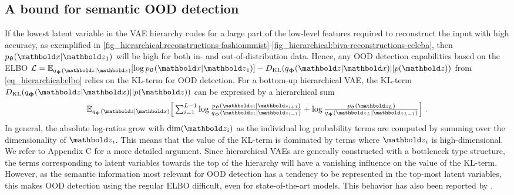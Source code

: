 {\subsection{A bound for semantic OOD detection}
If the lowest latent variable in the VAE hierarchy codes for a large part of the low-level features required to reconstruct the input with high accuracy, as exemplified in \cref{fig_hierarchical:reconstructions-fashionmnist}-\ref{fig_hierarchical:biva-reconstructions-celeba}, then $p_\thetab(\xb|\zb_1)$ will be high for both in- and out-of-distribution data.
Hence, any OOD detection capabilities based on the ELBO $\mathcal{L} = \mathbb{E}_{q_\phib(\zb|\xb)}[\log p_\thetab(\xb|\zb_1)] - D_{\mathrm{KL}}( q_\phib(\zb|\xb) || p(\zb))$ from \cref{eq_hierarchical:elbo} relies on the KL-term for OOD detection. For a bottom-up hierarchical VAE, the KL-term $D_{\mathrm{KL}}( q_\phib(\zb|\xb) || p(\zb))$ can be expressed by a hierarchical sum%
\begin{equation}
    \mathbb{E}_{q_\phib(\zb|\xb)} \Big[ \textstyle\sum_{i=1}^{L-1} \log \frac{p_\thetab(\zb_i|\zb_{i+1})}{q_\phib(\zb_i|\zb_{i-1})} + \log \frac{p_\thetab(\zb_L)}{q_\phib(\zb_L|\zb_{L-1})} \Big] \ .
\end{equation}
In general, the absolute log-ratios grow with $\mathrm{dim}(\zb_i)$ as the individual log probability terms are computed by summing over the dimensionality of $\zb_i$.
This means that the value of the KL-term is dominated by terms where $\zb_i$ is high-dimensional. We refer to Appendix C for a more detailed argument.
Since hierarchical VAEs are generally constructed with a bottleneck type structure, the terms corresponding to latent variables towards the top of the hierarchy will have a vanishing influence on the value of the KL-term.
However, as the semantic information most relevant for OOD detection has a tendency to be represented in the top-most latent variables, this makes OOD detection using the regular ELBO difficult, even for state-of-the-art models.
This behavior has also been reported by \textcite{xiao_likelihood_2020}.

}
